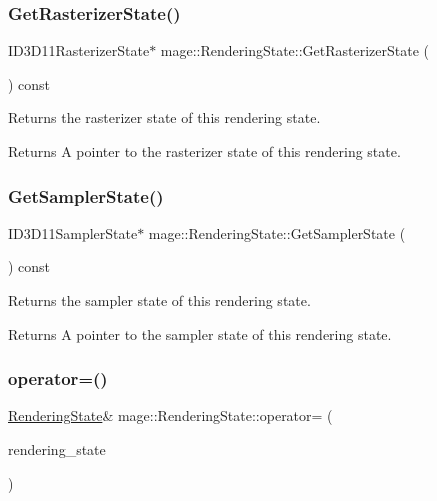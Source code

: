 \subsubsection{\texorpdfstring{Get\+Rasterizer\+State()}{GetRasterizerState()}}
{\footnotesize\ttfamily I\+D3\+D11\+Rasterizer\+State$\ast$ mage\+::\+Rendering\+State\+::\+Get\+Rasterizer\+State (\begin{DoxyParamCaption}{ }\end{DoxyParamCaption}) const}

Returns the rasterizer state of this rendering state.

\begin{DoxyReturn}{Returns}
A pointer to the rasterizer state of this rendering state. 
\end{DoxyReturn}
\hypertarget{structmage_1_1_rendering_state_a251773f942157b07a7d3272e5e3c8a2e}{}\label{structmage_1_1_rendering_state_a251773f942157b07a7d3272e5e3c8a2e} 
\subsubsection{\texorpdfstring{Get\+Sampler\+State()}{GetSamplerState()}}
{\footnotesize\ttfamily I\+D3\+D11\+Sampler\+State$\ast$ mage\+::\+Rendering\+State\+::\+Get\+Sampler\+State (\begin{DoxyParamCaption}{ }\end{DoxyParamCaption}) const}

Returns the sampler state of this rendering state.

\begin{DoxyReturn}{Returns}
A pointer to the sampler state of this rendering state. 
\end{DoxyReturn}
\hypertarget{structmage_1_1_rendering_state_af03ad38dd9b88949fc9d3603e4829c26}{}\label{structmage_1_1_rendering_state_af03ad38dd9b88949fc9d3603e4829c26} 
\subsubsection{\texorpdfstring{operator=()}{operator=()}\hspace{0.1cm}{\footnotesize\ttfamily [1/2]}}
{\footnotesize\ttfamily \hyperlink{structmage_1_1_rendering_state}{Rendering\+State}\& mage\+::\+Rendering\+State\+::operator= (\begin{DoxyParamCaption}\item[{const \hyperlink{structmage_1_1_rendering_state}{Rendering\+State} \&}]{rendering\+\_\+state }\end{DoxyParamCaption})\hspace{0.3cm}{\ttfamily [delete]}}


